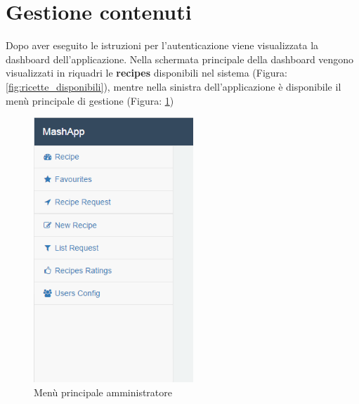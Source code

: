 %


\section{Gestione contenuti} %
\label{sec:gestione_contenuti}
	Dopo aver eseguito le istruzioni per l'autenticazione\gloss{} viene visualizzata la dashboard\gloss{} dell’applicazione.\newline
	Nella schermata principale della dashboard\gloss{} vengono visualizzati in riquadri le \textbf{recipes}\gloss{} disponibili nel sistema (Figura: \ref{fig:ricette_disponibili}), mentre nella sinistra dell'applicazione è disponibile il menù principale di gestione (Figura: \ref{fig:menu_principale_utente})
	\begin{figure}[H]
		\centering
		\centerline{\includegraphics[width=6cm]{images/menu_principale_amministratore.png}}
		\caption{Menù principale amministratore}
		\label{fig:menu_principale_utente}
	\end{figure}

